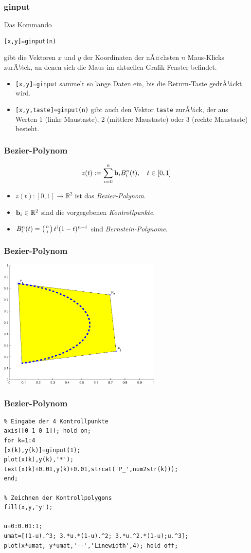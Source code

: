 %
%
\begin{frame}[fragile]\frametitle{ginput}
Das Kommando 
\begin{lstlisting}
[x,y]=ginput(n)
\end{lstlisting}
gibt die Vektoren $x$ und $y$ der Koordinaten der nÃ¤chsten $n$
Maus-Klicks zurÃ¼ck, an denen sich die Maus im aktuellen Grafik-Fenster
befindet.  
\begin{itemize}
\item \lstinline![x,y]=ginput! sammelt so lange Daten ein, bis die
  Return-Taste gedrÃ¼ckt wird.
\item \lstinline![x,y,taste]=ginput(n)! gibt auch den Vektor \lstinline!taste!
  zurÃ¼ck, der aus Werten $1$ (linke Maustaste), $2$ (mittlere
  Maustaste) oder $3$ (rechte Maustaste) besteht. 
\end{itemize} 
\end{frame}
%
%
\begin{frame}[fragile]\frametitle{Bezier-Polynom}
\alert{ \[ z (t):=\sum_{i=0}^n {\bf b}_i B_i^n(t), \quad t \in [0,1] \]}
\begin{itemize}
\item $z(t): [0,1] \rightarrow \mathbb{R}^2$ ist das {\it Bezier-Polynom}.
\item ${\bf b}_i \in \mathbb{R}^2$ sind die vorgegebenen 
{\it Kontrollpunkte}.
\item $B_i^n(t)=\left( n \atop i \right) t^i (1-t)^{n-i}$ sind 
{\it Bernstein-Polynome}.
\end{itemize}
\end{frame}
%
%
\begin{frame}[fragile]\frametitle{Bezier-Polynom}
\includegraphics[width=\linewidth,
  height=6.5cm]{./figures/bezier}
\end{frame}
%
%
\begin{frame}[fragile]\frametitle{Bezier-Polynom}
\begin{lstlisting}
% Eingabe der 4 Kontrollpunkte
axis([0 1 0 1]); hold on;
for k=1:4
[x(k),y(k)]=ginput(1);
plot(x(k),y(k),'*'); 
text(x(k)+0.01,y(k)+0.01,strcat('P_',num2str(k)));
end;

% Zeichnen der Kontrollpolygons
fill(x,y,'y');

u=0:0.01:1;
umat=[(1-u).^3; 3.*u.*(1-u).^2; 3.*u.^2.*(1-u);u.^3];
plot(x*umat, y*umat,'--','Linewidth',4); hold off;
\end{lstlisting}
\end{frame}
